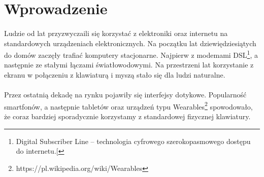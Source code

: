 \section{Wprowadzenie}
\paragraph{}
Ludzie od lat przyzwyczaili się korzystać z elektroniki oraz internetu na standardowych urządzeniach elektronicznych. Na początku lat dziewiędziesiątych do domów zaczęły trafiać komputery stacjonarne. Najpierw z modemami DSL\footnote{Digital Subscriber Line – technologia cyfrowego szerokopasmowego dostępu do internetu.[}, a następnie ze stałymi łączami światłowodowymi. Na przestrzeni lat korzystanie z ekranu w połączeniu z klawiaturą i myszą stało się dla ludzi naturalne.
\paragraph{}
Przez ostatnią dekadę na rynku pojawiły się interfejsy dotykowe. Popularność smartfonów, a następnie tabletów oraz urządzeń typu Wearables\footnote{https://pl.wikipedia.org/wiki/Wearables} spowodowało, że coraz bardziej sporadycznie korzystamy z standardowej fizycznej klawiatury.
